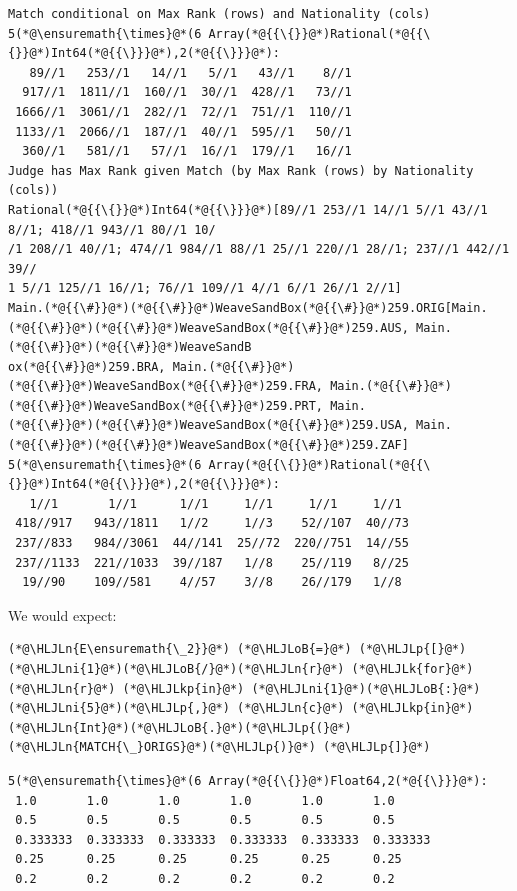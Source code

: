 \documentclass[12pt,a4paper]{article}
\newcommand{\HLJLk}[1]{\textcolor[RGB]{148,91,176}{\textbf{#1}}}
\newcommand{\HLJLkp}[1]{\textcolor[RGB]{148,91,176}{\textbf{#1}}}
\newcommand{\HLJLn}[1]{#1}
\newcommand{\HLJLni}[1]{\textcolor[RGB]{59,151,46}{#1}}
\newcommand{\HLJLoB}[1]{\textcolor[RGB]{102,102,102}{\textbf{#1}}}
\newcommand{\HLJLp}[1]{#1}
\begin{document}
\begin{lstlisting}
Match conditional on Max Rank (rows) and Nationality (cols)
5(*@\ensuremath{\times}@*(6 Array(*@{{\{}}@*)Rational(*@{{\{}}@*)Int64(*@{{\}}}@*),2(*@{{\}}}@*):
   89//1   253//1   14//1   5//1   43//1    8//1
  917//1  1811//1  160//1  30//1  428//1   73//1
 1666//1  3061//1  282//1  72//1  751//1  110//1
 1133//1  2066//1  187//1  40//1  595//1   50//1
  360//1   581//1   57//1  16//1  179//1   16//1
Judge has Max Rank given Match (by Max Rank (rows) by Nationality (cols))
Rational(*@{{\{}}@*)Int64(*@{{\}}}@*)[89//1 253//1 14//1 5//1 43//1 8//1; 418//1 943//1 80//1 10/
/1 208//1 40//1; 474//1 984//1 88//1 25//1 220//1 28//1; 237//1 442//1 39//
1 5//1 125//1 16//1; 76//1 109//1 4//1 6//1 26//1 2//1]
Main.(*@{{\#}}@*)(*@{{\#}}@*)WeaveSandBox(*@{{\#}}@*)259.ORIG[Main.(*@{{\#}}@*)(*@{{\#}}@*)WeaveSandBox(*@{{\#}}@*)259.AUS, Main.(*@{{\#}}@*)(*@{{\#}}@*)WeaveSandB
ox(*@{{\#}}@*)259.BRA, Main.(*@{{\#}}@*)(*@{{\#}}@*)WeaveSandBox(*@{{\#}}@*)259.FRA, Main.(*@{{\#}}@*)(*@{{\#}}@*)WeaveSandBox(*@{{\#}}@*)259.PRT, Main.
(*@{{\#}}@*)(*@{{\#}}@*)WeaveSandBox(*@{{\#}}@*)259.USA, Main.(*@{{\#}}@*)(*@{{\#}}@*)WeaveSandBox(*@{{\#}}@*)259.ZAF]
5(*@\ensuremath{\times}@*(6 Array(*@{{\{}}@*)Rational(*@{{\{}}@*)Int64(*@{{\}}}@*),2(*@{{\}}}@*):
   1//1       1//1      1//1     1//1     1//1     1//1
 418//917   943//1811   1//2     1//3    52//107  40//73
 237//833   984//3061  44//141  25//72  220//751  14//55
 237//1133  221//1033  39//187   1//8    25//119   8//25
  19//90    109//581    4//57    3//8    26//179   1//8
\end{lstlisting}


We would expect:


\begin{lstlisting}
(*@\HLJLn{E\ensuremath{\_2}}@*) (*@\HLJLoB{=}@*) (*@\HLJLp{[}@*) (*@\HLJLni{1}@*)(*@\HLJLoB{/}@*)(*@\HLJLn{r}@*) (*@\HLJLk{for}@*) (*@\HLJLn{r}@*) (*@\HLJLkp{in}@*) (*@\HLJLni{1}@*)(*@\HLJLoB{:}@*)(*@\HLJLni{5}@*)(*@\HLJLp{,}@*) (*@\HLJLn{c}@*) (*@\HLJLkp{in}@*) (*@\HLJLn{Int}@*)(*@\HLJLoB{.}@*)(*@\HLJLp{(}@*)(*@\HLJLn{MATCH{\_}ORIGS}@*)(*@\HLJLp{)}@*) (*@\HLJLp{]}@*)
\end{lstlisting}

\begin{lstlisting}
5(*@\ensuremath{\times}@*(6 Array(*@{{\{}}@*)Float64,2(*@{{\}}}@*):
 1.0       1.0       1.0       1.0       1.0       1.0
 0.5       0.5       0.5       0.5       0.5       0.5
 0.333333  0.333333  0.333333  0.333333  0.333333  0.333333
 0.25      0.25      0.25      0.25      0.25      0.25
 0.2       0.2       0.2       0.2       0.2       0.2
\end{lstlisting}
\end{document}
